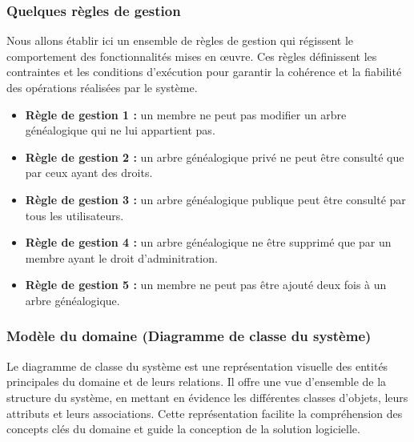 \subsubsection{Quelques règles de gestion}

Nous allons établir ici un ensemble de règles de gestion qui régissent le
comportement des fonctionnalités mises en œuvre. Ces règles définissent les
contraintes et les conditions d’exécution pour garantir la cohérence et la
fiabilité des opérations réalisées par le système.

\begin{itemize}
  \item \textbf{Règle de gestion 1 :} un membre ne peut pas modifier un arbre généalogique qui ne lui appartient pas.
  \item \textbf{Règle de gestion 2 :} un arbre généalogique privé ne peut être consulté que par ceux ayant des droits.
  \item \textbf{Règle de gestion 3 :} un arbre généalogique publique peut être consulté par tous les utilisateurs.
  \item \textbf{Règle de gestion 4 :} un arbre généalogique ne être supprimé que par un  membre ayant le droit d'adminitration.
  \item \textbf{Règle de gestion 5 :} un membre ne peut pas être ajouté deux fois à un arbre généalogique.
\end{itemize}

\subsubsection{Modèle du domaine (Diagramme de classe du système)}
Le diagramme de classe du système est une représentation visuelle des
entités principales du domaine et de leurs relations. Il offre une vue
d'ensemble de la structure du système, en mettant en évidence les différentes
classes d'objets, leurs attributs et leurs associations. Cette représentation
facilite la compréhension des concepts clés du domaine et guide la conception
de la solution logicielle.


